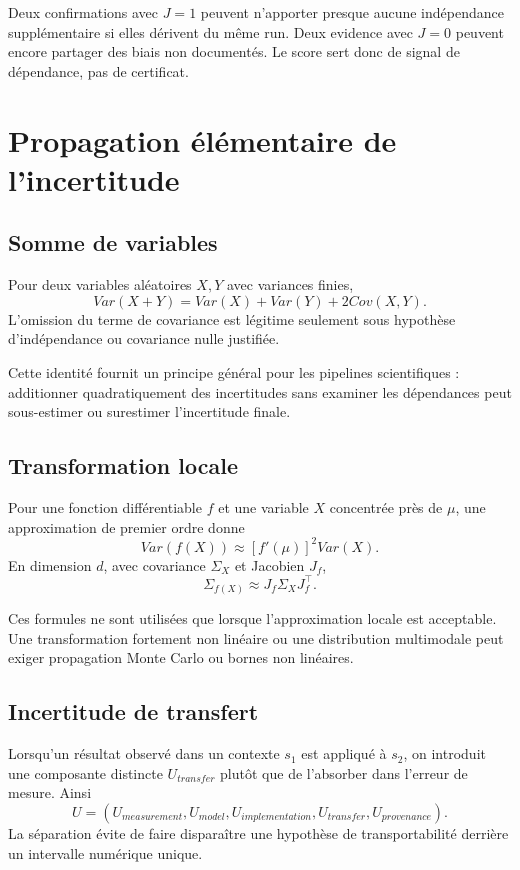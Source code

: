 Deux confirmations avec $J=1$ peuvent n'apporter presque aucune indépendance supplémentaire si elles dérivent du même run. Deux evidence avec $J=0$ peuvent encore partager des biais non documentés. Le score sert donc de signal de dépendance, pas de certificat.

\chapter{Propagation élémentaire de l'incertitude}

\section{Somme de variables}

Pour deux variables aléatoires $X,Y$ avec variances finies,
\[
Var(X+Y)=Var(X)+Var(Y)+2Cov(X,Y).
\]
L'omission du terme de covariance est légitime seulement sous hypothèse d'indépendance ou covariance nulle justifiée.

Cette identité fournit un principe général pour les pipelines scientifiques : additionner quadratiquement des incertitudes sans examiner les dépendances peut sous-estimer ou surestimer l'incertitude finale.

\section{Transformation locale}

Pour une fonction différentiable $f$ et une variable $X$ concentrée près de $\mu$, une approximation de premier ordre donne
\[
Var(f(X))\approx [f'(\mu)]^2Var(X).
\]
En dimension $d$, avec covariance $\Sigma_X$ et Jacobien $J_f$,
\[
\Sigma_{f(X)}\approx J_f\Sigma_XJ_f^{\top}.
\]

Ces formules ne sont utilisées que lorsque l'approximation locale est acceptable. Une transformation fortement non linéaire ou une distribution multimodale peut exiger propagation Monte Carlo ou bornes non linéaires.

\section{Incertitude de transfert}

Lorsqu'un résultat observé dans un contexte $s_1$ est appliqué à $s_2$, on introduit une composante distincte $U_{transfer}$ plutôt que de l'absorber dans l'erreur de mesure. Ainsi
\[
U=(U_{measurement},U_{model},U_{implementation},U_{transfer},U_{provenance}).
\]
La séparation évite de faire disparaître une hypothèse de transportabilité derrière un intervalle numérique unique.

